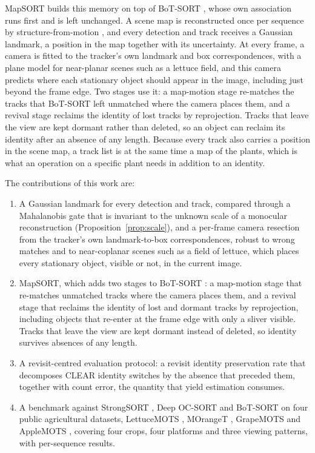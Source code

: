 \documentclass[pdflatex,sn-basic]{sn-jnl}%
\theoremstyle{thmstyleone}%
\begin{document}
MapSORT builds this memory on top of BoT-SORT \citep{aharon2022botsort}, whose own association runs first and is left unchanged.
A scene map is reconstructed once per sequence by structure-from-motion \citep{schonberger2016colmap}, and every detection and track receives a Gaussian landmark, a position in the map together with its uncertainty.
At every frame, a camera is fitted to the tracker's own landmark and box correspondences, with a plane model for near-planar scenes such as a lettuce field, and this camera predicts where each stationary object should appear in the image, including just beyond the frame edge.
Two stages use it: a map-motion stage re-matches the tracks that BoT-SORT left unmatched where the camera places them, and a revival stage reclaims the identity of lost tracks by reprojection.
Tracks that leave the view are kept dormant rather than deleted, so an object can reclaim its identity after an absence of any length.
Because every track also carries a position in the scene map, a track list is at the same time a map of the plants, which is what an operation on a specific plant needs in addition to an identity.

The contributions of this work are:
\begin{enumerate}
  \item A Gaussian landmark for every detection and track, compared through a Mahalanobis gate that is invariant to the unknown scale of a monocular reconstruction (Proposition~\ref{prop:scale}), and a per-frame camera resection from the tracker's own landmark-to-box correspondences, robust to wrong matches and to near-coplanar scenes such as a field of lettuce, which places every stationary object, visible or not, in the current image.
  \item MapSORT, which adds two stages to BoT-SORT \citep{aharon2022botsort}: a map-motion stage that re-matches unmatched tracks where the camera places them, and a revival stage that reclaims the identity of lost and dormant tracks by reprojection, including objects that re-enter at the frame edge with only a sliver visible. Tracks that leave the view are kept dormant instead of deleted, so identity survives absences of any length.
  \item A revisit-centred evaluation protocol: a revisit identity preservation rate that decomposes CLEAR identity switches \citep{bernardin2008clear} by the absence that preceded them, together with count error, the quantity that yield estimation consumes.
  \item A benchmark against StrongSORT \citep{du2023strongsort}, Deep OC-SORT \citep{maggiolino2023deepocsort} and BoT-SORT \citep{aharon2022botsort} on four public agricultural datasets, LettuceMOTS \citep{hu2024lettucemots}, MOrangeT \citep{santos2024moranget}, GrapeMOTS \citep{arizasentis2024grapemots} and AppleMOTS \citep{dejong2022applemots}, covering four crops, four platforms and three viewing patterns, with per-sequence results.
\end{enumerate}
\end{document}
